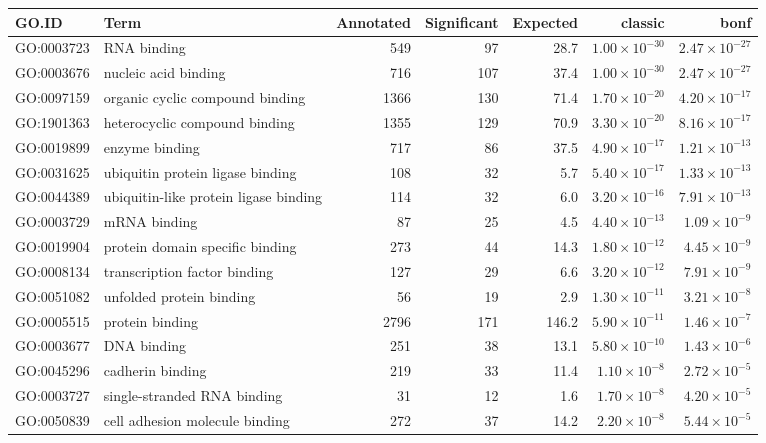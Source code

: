 \begin{table}[ht]
\centering
\begin{tabular}{llrrrrr}
  \hline
GO.ID & Term & Annotated & Significant & Expected & classic & bonf \\ 
  \hline
GO:0003723 & RNA binding & 549 & 97 & 28.7 & $1.00 \times 10^{-30}$ & $2.47 \times 10^{-27}$ \\ 
  GO:0003676 & nucleic acid binding & 716 & 107 & 37.4 & $1.00 \times 10^{-30}$ & $2.47 \times 10^{-27}$ \\ 
  GO:0097159 & organic cyclic compound binding & 1366 & 130 & 71.4 & $1.70 \times 10^{-20}$ & $4.20 \times 10^{-17}$ \\ 
  GO:1901363 & heterocyclic compound binding & 1355 & 129 & 70.9 & $3.30 \times 10^{-20}$ & $8.16 \times 10^{-17}$ \\ 
  GO:0019899 & enzyme binding & 717 & 86 & 37.5 & $4.90 \times 10^{-17}$ & $1.21 \times 10^{-13}$ \\ 
  GO:0031625 & ubiquitin protein ligase binding & 108 & 32 & 5.7 & $5.40 \times 10^{-17}$ & $1.33 \times 10^{-13}$ \\ 
  GO:0044389 & ubiquitin-like protein ligase binding & 114 & 32 & 6.0 & $3.20 \times 10^{-16}$ & $7.91 \times 10^{-13}$ \\ 
  GO:0003729 & mRNA binding & 87 & 25 & 4.5 & $4.40 \times 10^{-13}$ & $1.09 \times 10^{-9}$ \\ 
  GO:0019904 & protein domain specific binding & 273 & 44 & 14.3 & $1.80 \times 10^{-12}$ & $4.45 \times 10^{-9}$ \\ 
  GO:0008134 & transcription factor binding & 127 & 29 & 6.6 & $3.20 \times 10^{-12}$ & $7.91 \times 10^{-9}$ \\ 
  GO:0051082 & unfolded protein binding & 56 & 19 & 2.9 & $1.30 \times 10^{-11}$ & $3.21 \times 10^{-8}$ \\ 
  GO:0005515 & protein binding & 2796 & 171 & 146.2 & $5.90 \times 10^{-11}$ & $1.46 \times 10^{-7}$ \\ 
  GO:0003677 & DNA binding & 251 & 38 & 13.1 & $5.80 \times 10^{-10}$ & $1.43 \times 10^{-6}$ \\ 
  GO:0045296 & cadherin binding & 219 & 33 & 11.4 & $1.10 \times 10^{-8}$ & $2.72 \times 10^{-5}$ \\ 
  GO:0003727 & single-stranded RNA binding & 31 & 12 & 1.6 & $1.70 \times 10^{-8}$ & $4.20 \times 10^{-5}$ \\ 
  GO:0050839 & cell adhesion molecule binding & 272 & 37 & 14.2 & $2.20 \times 10^{-8}$ & $5.44 \times 10^{-5}$ \\ 

\end{tabular}
\end{table}
